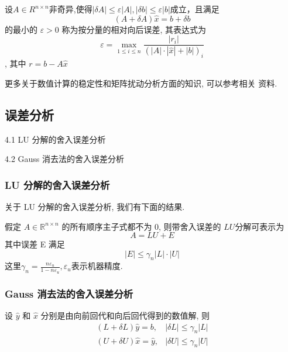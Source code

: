 \documentclass[12pt,a4paper]{article}
\begin{document}
\begin{framed}
	\begin{theorem}
		设$ A∈ R^{n×n}$非奇异,使得$|\delta A| \leq \varepsilon|A|,|\delta b| \leq \varepsilon|b|$成立，且满足
		\begin{equation}
		(A+\delta A) \hat{x}=b+\delta b
		\end{equation}
		的最小的 $ε > 0$ 称为按分量的相对向后误差, 其表达式为
		\begin{equation}
		\varepsilon=\max _{1 \leq i \leq n} \frac{\left|r_{i}\right|}{(|A| \cdot|\hat{x}|+|b|)_{i}}
		\end{equation},
		其中 $r = b − A\hat{x}$
	\end{theorem}
\end{framed}

更多关于数值计算的稳定性和矩阵扰动分析方面的知识, 可以参考相关
资料.

\subsection{误差分析}

4.1 LU 分解的舍入误差分析

4.2 Gauss 消去法的舍入误差分析

\subsubsection{LU 分解的舍入误差分析}
关于 LU 分解的舍入误差分析, 我们有下面的结果.
\begin{framed}
	\begin{theorem}
		假定 $A ∈ \mathbb{R}^{n×n}$ 的所有顺序主子式都不为 $0$, 则带舍入误差的 $LU$分解可表示为
		\begin{equation}
		A=L U+E
		\end{equation}
		其中误差 E 满足
		\begin{equation}
		|E| \leq \gamma_{n}|L| \cdot|U|
		\end{equation}
		这里$\gamma_{n}=\frac{n \varepsilon_{u}}{1-n \varepsilon_{u}}, \varepsilon_{u}$表示机器精度.
	\end{theorem}
\end{framed}

\subsubsection{Gauss 消去法的舍入误差分析}
\begin{framed}
	\begin{lemma}[High02] 设 $\hat{y}$ 和 $\hat{x}$ 分别是由向前回代和向后回代得到的数值解, 则
		\begin{equation}
		\begin{array}{ll}{(L+\delta L) \hat{y}=b,} & {|\delta L| \leq \gamma_{n}|L|} \\ {(U+\delta U) \hat{x}=\hat{y},} & {|\delta U| \leq \gamma_{n}|U|}\end{array}
		\end{equation}
	\end{lemma}
\end{framed}
\end{document}
